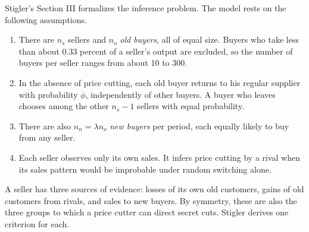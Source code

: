 Stigler's Section III formalizes the inference problem. The model rests on the following assumptions.
\begin{enumerate}[label=(S\arabic*)]
\item There are $n_s$ sellers and $n_o$ \emph{old buyers}, all of equal size. Buyers who take less than about 0.33
      percent of a seller's output are excluded, so the number of buyers per seller ranges from about 10 to 300.
\item In the absence of price cutting, each old buyer returns to his regular supplier with probability $\phi$,
      independently of other buyers. A buyer who leaves chooses among the other $n_s - 1$ sellers with equal
      probability.
\item There are also $n_n = \lambda n_o$ \emph{new buyers} per period, each equally likely to buy from any seller.
\item Each seller observes only its own sales. It infers price cutting by a rival when its sales pattern would be
      improbable under random switching alone.
\end{enumerate}
A seller has three sources of evidence: losses of its own old customers, gains of old customers from rivals, and
sales to new buyers. By symmetry, these are also the three groups to which a price cutter can direct secret cuts.
Stigler derives one criterion for each.


